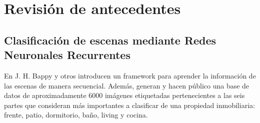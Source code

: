 \section{Revisión de antecedentes}\label{sec:revision_antecedentes}
\subsection{Clasificación de escenas mediante Redes Neuronales Recurrentes}\label{clahe:explanation}
En \cite{lstm_real_estate} J. H. Bappy y otros introducen un framework para aprender la información de las escenas de manera secuencial. Además, generan y hacen público una base de datos de aproximadamente 6000 imágenes etiquetadas pertenecientes a las seis partes que consideran más importantes a clasificar de una propiedad inmobiliaria: frente, patio, dormitorio, baño, living y cocina.

